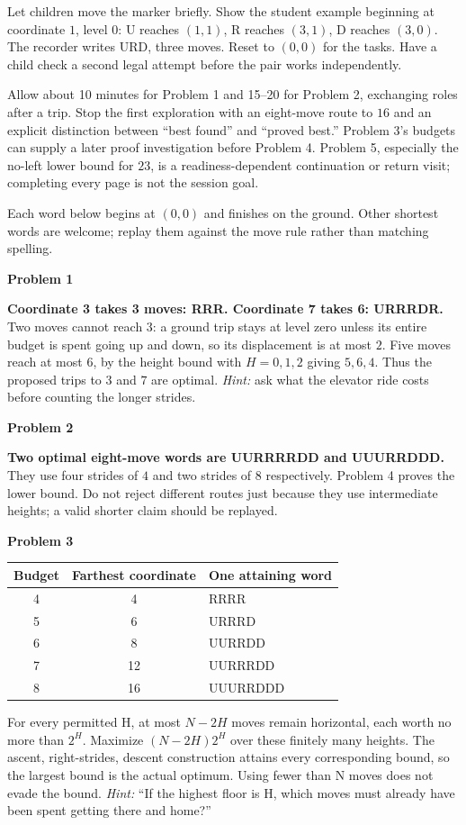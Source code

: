 \documentclass[11pt,letterpaper]{article}
\newcommand{\sect}[1]{\par\vspace{5pt}{\large\bfseries #1}\par}
\newcommand{\prob}[1]{\par\vspace{3pt}\textbf{Problem #1}\par}
\begin{document}
\sect{Launch and a feasible first visit}
Let children move the marker briefly. Show the student example beginning at
coordinate $1$, level $0$: U reaches $(1,1)$, R reaches $(3,1)$, D reaches
$(3,0)$. The recorder writes URD, three moves. Reset to $(0,0)$ for the tasks.
Have a child check a second legal attempt before the pair works independently.

Allow about 10 minutes for Problem 1 and 15--20 for Problem 2, exchanging roles
after a trip. Stop the first exploration with an eight-move route to $16$ and
an explicit distinction between ``best found'' and ``proved best.''
Problem 3's budgets can supply a later proof investigation before Problem 4.
Problem 5, especially the no-left lower bound for $23$, is a readiness-dependent
continuation or return visit; completing every page is not the session goal.
\newpage
\sect{Answers and optional hints}
Each word below begins at $(0,0)$ and finishes on the ground. Other shortest
words are welcome; replay them against the move rule rather than matching spelling.

\prob{1}
\textbf{Coordinate 3 takes 3 moves: RRR. Coordinate 7 takes 6: URRRDR.}
Two moves cannot reach $3$: a ground trip stays at level zero unless its entire
budget is spent going up and down, so its displacement is at most $2$.
Five moves reach at most $6$, by the height bound with $H=0,1,2$ giving
$5,6,4$. Thus the proposed trips to $3$ and $7$ are optimal.
\textit{Hint:} ask what the elevator ride costs before counting the longer strides.

\prob{2}
\textbf{Two optimal eight-move words are UURRRRDD and UUURRDDD.}
They use four strides of $4$ and two strides of $8$ respectively.
Problem 4 proves the lower bound. Do not reject different routes just because
they use intermediate heights; a valid shorter claim should be replayed.

\prob{3}
\begin{center}
\begin{tabular}{@{}ccl@{}}\toprule
Budget & Farthest coordinate & One attaining word\\\midrule
4 & 4 & RRRR\\
5 & 6 & URRRD\\
6 & 8 & UURRDD\\
7 & 12 & UURRRDD\\
8 & 16 & UUURRDDD\\\bottomrule
\end{tabular}
\end{center}
For every permitted H, at most $N-2H$ moves remain horizontal, each worth no more
than $2^H$. Maximize $(N-2H)2^H$ over these finitely many heights. The ascent,
right-strides, descent construction attains every corresponding bound, so the
largest bound is the actual optimum. Using fewer than N moves does not evade
the bound. \textit{Hint:} ``If the highest floor is H, which moves must already
have been spent getting there and home?''
\end{document}
